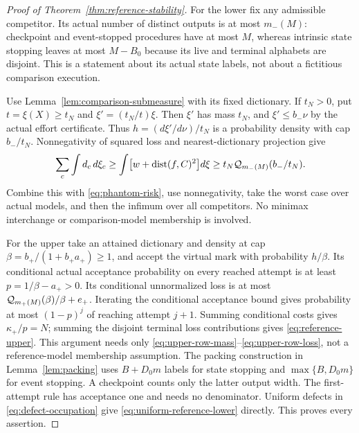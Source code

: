 \begin{proof}[Proof of Theorem~\ref{thm:reference-stability}]
For the lower fix any admissible competitor. Its actual number of distinct outputs is at most $m_-(M)$: checkpoint and event-stopped procedures have at most $M$, whereas intrinsic state stopping leaves at most $M-B_0$ because its live and terminal alphabets are disjoint. This is a statement about its actual state labels, not about a fictitious comparison execution.

Use Lemma~\ref{lem:comparison-submeasure} with its fixed dictionary. If $t_N>0$, put $t=\xi(X)\ge t_N$ and $\xi'=(t_N/t)\xi$. Then $\xi'$ has mass $t_N$, and $\xi'\le b_-\nu$ by the actual effort certificate. Thus $h=(d\xi'/d\nu)/t_N$ is a probability density with cap $b_-/t_N$. Nonnegativity of squared loss and nearest-dictionary projection give
\[
 \sum_c\int d_c\,d\xi_c
 \ge\int\bigl[w+\operatorname{dist}(f,C)^2\bigr]d\xi
 \ge t_N\mathcal Q_{m_-(M)}(b_-/t_N).
\]
Combine this with \eqref{eq:phantom-risk}, use nonnegativity, take the worst case over actual models, and then the infimum over all competitors. No minimax interchange or comparison-model membership is involved.

For the upper take an attained dictionary and density at cap
$\beta=b_+/(1+b_+a_+)\ge1$, and accept the virtual mark with probability $h/\beta$. Its conditional actual acceptance probability on every reached attempt is at least $p=1/\beta-a_+>0$. Its conditional unnormalized loss is at most $\mathcal Q_{m_+(M)}(\beta)/\beta+e_+$. Iterating the conditional acceptance bound gives probability at most $(1-p)^j$ of reaching attempt $j+1$. Summing conditional costs gives $\kappa_+/p=N$; summing the disjoint terminal loss contributions gives \eqref{eq:reference-upper}. This argument needs only \eqref{eq:upper-row-mass}--\eqref{eq:upper-row-loss}, not a reference-model membership assumption. The packing construction in Lemma~\ref{lem:packing} uses $B+D_0m$ labels for state stopping and $\max\{B,D_0m\}$ for event stopping. A checkpoint counts only the latter output width. The first-attempt rule has acceptance one and needs no denominator. Uniform defects in \eqref{eq:defect-occupation} give \eqref{eq:uniform-reference-lower} directly. This proves every assertion.
\end{proof}

